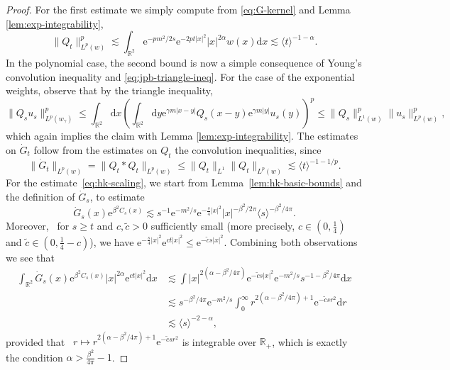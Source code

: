 \documentclass[11pt, a4paper]{scrartcl}
\numberwithin{equation}{section}
\theoremstyle{plain}
\theoremstyle{remark}
\newcommand{\mathd}{\mathrm{d}}
\newcommand{\mathe}{\mathrm{e}}
\begin{document}
\begin{proof}
  For the first estimate we simply compute from \eqref{eq:G-kernel} and Lemma
  \ref{lem:exp-integrability},
  \[ \| Q_t \|_{L^p (w)}^p \lesssim \int_{\mathbb{R}^2} \mathe^{- pm^2 / 2 s}
     \mathe^{- 2 pt | x |^2} | x |^{2 \alpha} w (x) \mathd x \lesssim \langle
     t \rangle^{- 1 - \alpha} . \]
  In the polynomial case, the second bound is now a simple consequence of
  Young's convolution inequality and \eqref{eq:jpb-triangle-ineq}. For the
  case of the exponential weights, observe that by the triangle inequality,
  \[ \| Q_s u_s \|_{L^p (w_{\gamma})}^p \leqslant \int_{\mathbb{R}^2} \mathd x
     \left( \int_{\mathbb{R}^2} \mathd y \mathe^{\gamma m | x - y |} Q_s (x -
     y) \mathe^{\gamma m | y |} u_s (y) \right)^p \leqslant \| Q_s \|^p_{L^1
     (w)} \| u_s \|_{L^p (w)}^p, \]
  which again implies the claim with Lemma \ref{lem:exp-integrability}. The
  estimates on $\dot{G}_t$ follow from the estimates on $Q_t$ the convolution
  inequalities, since
  \[ \| \dot{G}_t \|_{L^p (w)} = \| Q_t \ast Q_t \|_{L^p (w)} \leqslant \|
     Q_t \|_{L^1} \| Q_t \|_{L^p (w)} \lesssim \langle t \rangle^{- 1 - 1 / p}
     . \]
  For the estimate~\eqref{eq:hk-scaling}, we start from
  Lemma~\ref{lem:hk-basic-bounds} and the definition of $\dot{G}_s$, to
  estimate
  \[ \dot{G}_s (x) \mathe^{\beta^2 C_s (x)} \lesssim s^{- 1} \mathe^{- m^2 /
     s} \mathe^{- \frac{s}{4} | x |^2} | x |^{- \beta^2 / 2 \pi} \langle s
     \rangle^{- \beta^2 / 4 \pi} . \]
  Moreover, \ for $s \geqslant t$ and $c, \tilde{c} > 0$ sufficiently small
  (more precisely, $c \in \left( 0, \frac{1}{4} \right)$ and $\tilde{c} \in
  \left( 0, \frac{1}{4} - c \right)$), we have $\mathe^{- \frac{s}{4} | x |^2}
  \mathe^{c t | x |^2} \leqslant \mathe^{- \tilde{c} s | x |^2}$. Combining
  both observations we see that
  \[ \begin{aligned}
       \int_{\mathbb{R}^2} \dot{G}_s (x) \mathe^{\beta^2 C_s (x)} | x |^{2
       \alpha} \mathe^{c t | x |^2} \mathd x & \lesssim  \int | x |^{2
       (\alpha - \beta^2 / 4 \pi)} \mathe^{- \tilde{c} s | x |^2} \mathe^{-
       m^2 / s} s^{- 1 - \beta^2 / 4 \pi} \mathd x\\
       & \lesssim  s^{- \beta^2 / 4 \pi} \mathe^{- m^2 / s}  \int_0^{\infty}
       r^{2 (\alpha - \beta^2 / 4 \pi) + 1} \mathe^{- \tilde{c} s r^2} \mathd
       r\\
       & \lesssim  \langle s \rangle^{- 2 - \alpha},
     \end{aligned} \]
  provided that \ $r \mapsto r^{2 (\alpha - \beta^2 / 4 \pi) + 1} \mathe^{-
  \tilde{c} s r^2}$ is integrable over $\mathbb{R}_+$, which is exactly the
  condition $\alpha > \frac{\beta^2}{4 \pi} - 1$.
\end{proof}
\end{document}
